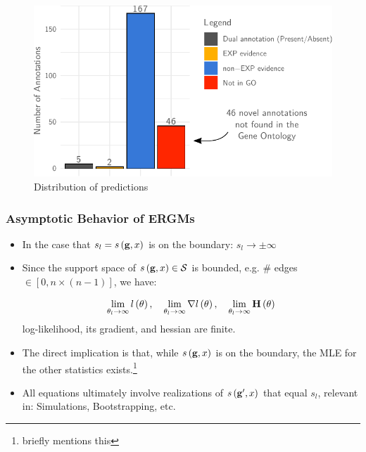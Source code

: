 \documentclass[aspectratio=169,9pt,handout]{beamer}
\begin{document}
\begin{frame}[c,label=aphylo-table]
\begin{minipage}[m]{.44\linewidth}
		
	\end{minipage}
	
	
	
\end{frame}

\begin{frame}[c,label=aphylo-200funs]
	\begin{figure}
		\includegraphics[width=.6\linewidth]{aphylo-results.pdf}
		\caption{Distribution of predictions}
	\end{figure}
	\vfill\hfill\hyperlink{aphylo-results-overview}{}
\end{frame}

\begin{frame}[label=discrete-exponential-theory]
	\frametitle{Asymptotic Behavior of ERGMs}
	
	\begin{itemize}
		\item In the case that $s_l = s\left(\mathbf{g}, x\right)$ is on the boundary: $s_l \to \pm\infty$\pause
		\item Since the support space of $s\left(\mathbf{g}, x\right)\in\mathcal{S}$ is bounded, e.g. \# edges $\in [0,n\times (n - 1)]$, we have: \pause
		
		\begin{equation*}
		\lim_{\theta_l\to\infty}\loglik{\theta}, \quad %
		\lim_{\theta_l\to\infty}\nabla\loglik{\theta}, \quad %
		\lim_{\theta_l\to\infty}\mathbf{H}\left(\theta\right)
		\end{equation*}
		log-likelihood, its gradient, and hessian are finite.\pause
		\item The direct implication is that, while $s\left(\mathbf{g}, x\right)$ is on the boundary, the MLE for the other statistics exists.\footnote{\cite{Handcock2003} briefly mentions this}\pause
		\item All equations ultimately involve realizations of $s\left(\mathbf{g}', x\right)$ that equal $s_l$, relevant in: Simulations, Bootstrapping, etc.
	\end{itemize}
	
	\vfill\hfill\hyperlink{discrete-exponential}{}
	
\end{frame}
\end{document}

